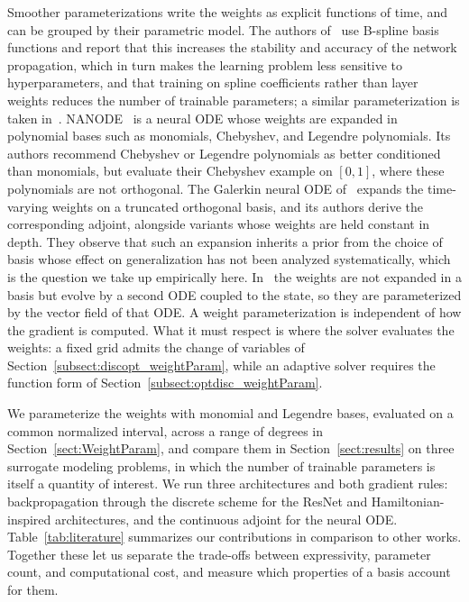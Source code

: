 \documentclass[pdflatex,sn-mathphys-num]{sn-jnl}%
\theoremstyle{thmstyleone}%
\theoremstyle{thmstyletwo}%
\theoremstyle{thmstylethree}%
\begin{document}
Smoother parameterizations write the weights as explicit functions of time, and can be grouped by their parametric model.
%
The authors of~\cite{gunther} use B-spline basis functions and report that this increases the stability and accuracy of the network propagation, which in turn makes the learning problem less sensitive to hyperparameters, and that training on spline coefficients rather than layer weights reduces the number of trainable parameters; a similar parameterization is taken in~\cite{generalized}.
%
NANODE~\cite{autonomous} is a neural ODE whose weights are expanded in polynomial bases such as monomials, Chebyshev, and Legendre polynomials.
%
Its authors recommend Chebyshev or Legendre polynomials as better conditioned than monomials, but evaluate their Chebyshev example on $[0,1]$, where these polynomials are not orthogonal.
%
The Galerkin neural ODE of~\cite{dissect} expands the time-varying weights on a truncated orthogonal basis, and its authors derive the corresponding adjoint, alongside variants whose weights are held constant in depth.
%
They observe that such an expansion inherits a prior from the choice of basis whose effect on generalization has not been analyzed systematically, which is the question we take up empirically here.
%
In~\cite{zhouNODES} the weights are not expanded in a basis but evolve by a second ODE coupled to the state, so they are parameterized by the vector field of that ODE.
%
A weight parameterization is independent of how the gradient is computed. What it must respect is where the solver evaluates the weights: a fixed grid admits the change of variables of Section~\ref{subsect:discopt_weightParam}, while an adaptive solver requires the function form of Section~\ref{subsect:optdisc_weightParam}.

We parameterize the weights with monomial and Legendre bases, evaluated on a common normalized interval, across a range of degrees in Section~\ref{sect:WeightParam}, and compare them in Section~\ref{sect:results} on three surrogate modeling problems, in which the number of trainable parameters is itself a quantity of interest.
%
We run three architectures and both gradient rules: backpropagation through the discrete scheme for the ResNet and Hamiltonian-inspired architectures, and the continuous adjoint for the neural ODE.
%
Table~\ref{tab:literature} summarizes our contributions in comparison to other works.
%
Together these let us separate the trade-offs between expressivity, parameter count, and computational cost, and measure which properties of a basis account for them.
\end{document}
